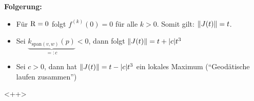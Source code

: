 \textbf{Folgerung:}\\
\begin{itemize}
    \item Für $\operatorname{R} = 0$ folgt $f^{(k)}(0)=0$ für alle $k>0$.
        Somit gilt: $\norm{J(t)}=t$.
    \item Sei $\underbrace{k_{\text{span}(v,w)} (p)}_{=:c} < 0$, dann folgt
        $\norm{J(t)} = t + \abs{c}t^3$
    \item Sei $c>0$, dann hat $\norm{J(t)}=t-\abs{c}t^3$ ein lokales Maximum (``Geodätische laufen zusammen'')
\end{itemize}

<++>














